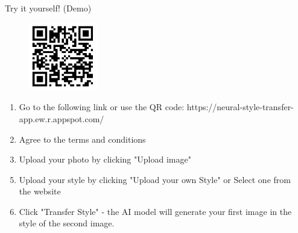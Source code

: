 \documentclass[final]{beamer}
\newlength{\sepwidth}
\newlength{\colwidth}
\newcommand{\separatorcolumn}{\begin{column}{\sepwidth}\end{column}}
\begin{document}
\begin{frame}{}
\begin{columns}[t]
\separatorcolumn
\begin{column}{\colwidth}
    \vspace{-2cm}
    \begin{myblock}{Try it yourself! (Demo)}
    \begin{figure}
        \vspace{-5cm}
        \includegraphics[width=0.28\textwidth]{Images/QR.png}
    \end{figure}

    \begin{minipage}{0.7\textwidth}
        \begin{enumerate}
            \item Go to the following link or use the QR code: https://neural-style-transfer-app.ew.r.appspot.com/
            \item Agree to the terms and conditions
            \item Upload your photo by clicking "Upload image"
        \end{enumerate}
    \end{minipage}
    \begin{enumerate}
            \setcounter{enumi}{4}
            \item Upload your style by clicking "Upload your own Style" or Select one from the website
            \item Click "Transfer Style" - the AI model will generate your first image in the style of the 
            second image.
    \end{enumerate}
    

\end{myblock}
\end{column}
\end{columns}
\end{frame}
\end{document}
